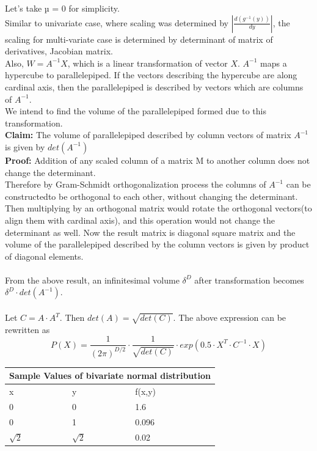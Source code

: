 \documentclass{article}
\begin{document}
Let's take µ = 0 for simplicity.\\
Similar to univariate case, where scaling was determined by $\left\lvert \frac{d(g^{-1}(y))}{dy}\right\rvert$, the scaling for multi-variate
case is determined by determinant of matrix of derivatives, Jacobian matrix.\\
Also, $W = A^{-1}X$, which is a linear transformation of vector $X$. $A^{-1}$ maps a hypercube to parallelepiped. If the vectors describing the hypercube are along cardinal axis, then the parallelepiped is described by vectors which are columns of $A^{-1}$.\\
We intend to find the volume of the parallelepiped formed due to this transformation.\\
{\bfseries Claim:} The volume of parallelepiped described by column vectors of matrix $A^{-1}$ is given by $det(A^{-1})$\\
{\bfseries Proof:} Addition of any scaled column of a matrix M to another column does not change the
determinant.\\
Therefore by Gram-Schmidt orthogonalization process the columns of $A^{-1}$ can be constructedto be orthogonal to each other, without changing the determinant. Then multiplying by an orthogonal matrix would rotate the orthogonal vectors(to align them with cardinal axis), and this
operation would not change the determinant as well. Now the result matrix is diagonal square
matrix and the volume of the parallelepiped described by the column vectors is given by product
of diagonal elements.\\
\\
From the above result, an infinitesimal volume $\delta^D$ after transformation becomes $\delta^D\cdot det(A^{-1})$.\\
\\
Let $C = A \cdot A^T$. Then $det(A)=\sqrt{det(C)}$. The above expression can be rewritten as
\begin{equation}
    P(X)=\frac{1}{(2\pi)^{D/2}}\cdot \frac{1}{\sqrt{det(C)}}\cdot exp(0.5\cdot X^T \cdot C^{-1}\cdot X)
\end{equation}

\begin{tabular}{|l|l||l|}
\hline
\multicolumn{3}{|c|}{Sample Values of bivariate normal distribution}\\
\hline
x&y&f(x,y)\\
\hline
0&0&1.6\\
0&1&0.096\\
$\sqrt{2}$&$\sqrt{2}$&0.02\\
\hline
\end{tabular}


\printbibliography
\end{document}

